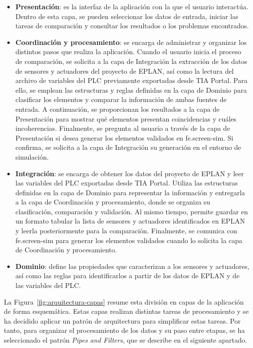\begin{itemize}

    \item \textbf{Presentación}: es la interfaz de la aplicación con la que el usuario interactúa. Dentro de esta capa, se pueden seleccionar los datos de entrada, iniciar las tareas de comparación y consultar los resultados o los problemas encontrados.
    \item \textbf{Coordinación y procesamiento}: se encarga de administrar y organizar los distintos pasos que realiza la aplicación. Cuando el usuario inicia el proceso de comparación, se solicita a la capa de Integración la extracción de los datos de sensores y actuadores del proyecto de EPLAN, así como la lectura del archivo de variables del PLC previamente exportadas desde TIA Portal. Para ello, se emplean las estructuras y reglas definidas en la capa de Dominio para clasificar los elementos y comparar la información de ambas fuentes de entrada. A continuación, se proporcionan los resultados a la capa de Presentación para mostrar qué elementos presentan coincidencias y cuáles  incoherencias. Finalmente, se pregunta al usuario a través de la capa de Presentación si desea generar los elementos validados en fe.screen-sim. Si confirma, se solicita a la capa de Integración su generación en el entorno de simulación.
    
    
    \item \textbf{Integración}: se encarga de obtener los datos del proyecto de EPLAN y leer las variables del PLC exportadas desde TIA Portal. Utiliza las estructuras definidas en la capa de Dominio para representar la información y entregarla a la capa de Coordinación y procesamiento, donde se organiza su clasificación, comparación y validación. Al mismo tiempo, permite guardar en un formato tabular la lista de sensores y actuadores identificados en EPLAN y leerla posteriormente para la comparación. Finalmente, se comunica con fe.screen-sim para generar los elementos validados cuando lo solicita la capa de Coordinación y procesamiento.
    
   \item \textbf{Dominio}: define las propiedades que caracterizan a los sensores y actuadores, así como las reglas para identificarlos a partir de los datos de EPLAN y de las variables del PLC.

\end{itemize}

La Figura~\ref{fig:arquitectura-capas} resume esta división en capas de la aplicación de forma esquemática. Estas capas realizan distintas tareas de procesamiento y se ha decidido aplicar un patrón de arquitectura para simplificar estas tareas. Por tanto, para organizar el procesamiento de los datos y su paso entre etapas, se ha seleccionado el patrón \textit{Pipes and Filters}, que se describe en el siguiente apartado.

